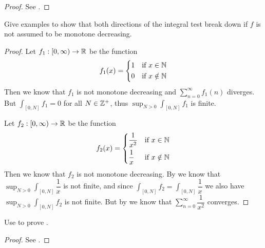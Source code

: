\begin{proof}
  See .
\end{proof}

\begin{ex}\label{i:ex:11.6.4}
  Give examples to show that both directions of the integral test break down if \(f\) is not assumed to be monotone decreasing.
\end{ex}

\begin{proof}
  Let \(f_1 : [0, \infty) \to \mathbb{R}\) be the function
  \[
    f_1(x) = \begin{dcases}
      1 & \text{if } x \in \mathbb{N}    \\
      0 & \text{if } x \notin \mathbb{N}
    \end{dcases}
  \]
  Then we know that \(f_1\) is not monotone decreasing and \(\sum_{n = 0}^\infty f_1(n)\) diverges.
  But \(\int_{[0, N]} f_1 = 0\) for all \(N \in \mathbb{Z}^+\), thus \(\sup_{N > 0} \int_{[0, N]} f_1\) is finite.

  Let \(f_2 : [0, \infty) \to \mathbb{R}\) be the function
  \[
    f_2(x) = \begin{dcases}
      \dfrac{1}{x^2} & \text{if } x \in \mathbb{N}    \\
      \dfrac{1}{x}   & \text{if } x \notin \mathbb{N}
    \end{dcases}
  \]
  Then we know that \(f_2\) is not monotone decreasing.
  By  we know that \(\sup_{N > 0} \int_{[0, N]} \dfrac{1}{x}\) is not finite, and since \(\int_{[0, N]} f_2 = \int_{[0, N]} \dfrac{1}{x}\) we also have \(\sup_{N > 0} \int_{[0, N]} f_2\) is not finite.
  But by  we know that \(\sum_{n = 0}^\infty \dfrac{1}{x^2}\) converges.
\end{proof}

\begin{ex}\label{i:ex:11.6.5}
  Use  to prove .
\end{ex}

\begin{proof}
  See .
\end{proof}
